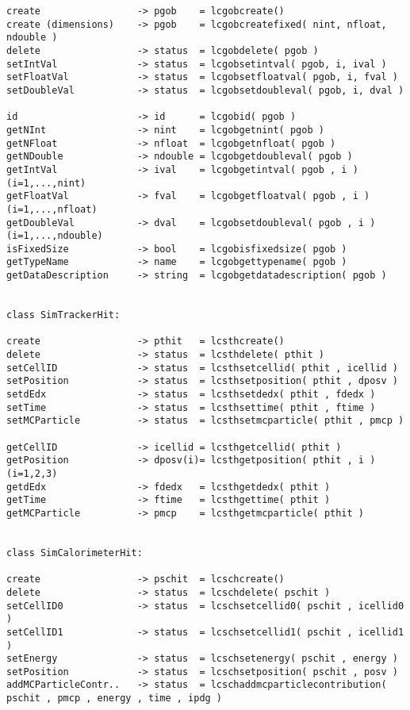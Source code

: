 \begin{scriptsize}
\begin{verbatim}
create                 -> pgob    = lcgobcreate()
create (dimensions)    -> pgob    = lcgobcreatefixed( nint, nfloat, ndouble )
delete                 -> status  = lcgobdelete( pgob )
setIntVal              -> status  = lcgobsetintval( pgob, i, ival )
setFloatVal            -> status  = lcgobsetfloatval( pgob, i, fval )
setDoubleVal           -> status  = lcgobsetdoubleval( pgob, i, dval )

id                     -> id      = lcgobid( pgob )
getNInt                -> nint    = lcgobgetnint( pgob )
getNFloat              -> nfloat  = lcgobgetnfloat( pgob )
getNDouble             -> ndouble = lcgobgetdoubleval( pgob )
getIntVal              -> ival    = lcgobgetintval( pgob , i )      (i=1,...,nint)
getFloatVal            -> fval    = lcgobgetfloatval( pgob , i )    (i=1,...,nfloat)
getDoubleVal           -> dval    = lcgobsetdoubleval( pgob , i )   (i=1,...,ndouble)
isFixedSize            -> bool    = lcgobisfixedsize( pgob )
getTypeName            -> name    = lcgobgettypename( pgob )
getDataDescription     -> string  = lcgobgetdatadescription( pgob )


class SimTrackerHit:

create                 -> pthit   = lcsthcreate()
delete                 -> status  = lcsthdelete( pthit )
setCellID              -> status  = lcsthsetcellid( pthit , icellid )
setPosition            -> status  = lcsthsetposition( pthit , dposv )
setdEdx                -> status  = lcsthsetdedx( pthit , fdedx )
setTime                -> status  = lcsthsettime( pthit , ftime )
setMCParticle          -> status  = lcsthsetmcparticle( pthit , pmcp )

getCellID              -> icellid = lcsthgetcellid( pthit )
getPosition            -> dposv(i)= lcsthgetposition( pthit , i ) (i=1,2,3)
getdEdx                -> fdedx   = lcsthgetdedx( pthit )
getTime                -> ftime   = lcsthgettime( pthit )
getMCParticle          -> pmcp    = lcsthgetmcparticle( pthit )


class SimCalorimeterHit:

create                 -> pschit  = lcschcreate()
delete                 -> status  = lcschdelete( pschit )
setCellID0             -> status  = lcschsetcellid0( pschit , icellid0 )
setCellID1             -> status  = lcschsetcellid1( pschit , icellid1 )
setEnergy              -> status  = lcschsetenergy( pschit , energy )
setPosition            -> status  = lcschsetposition( pschit , posv )
addMCParticleContr..   -> status  = lcschaddmcparticlecontribution( pschit , pmcp , energy , time , ipdg )


\end{verbatim}
\end{scriptsize}
